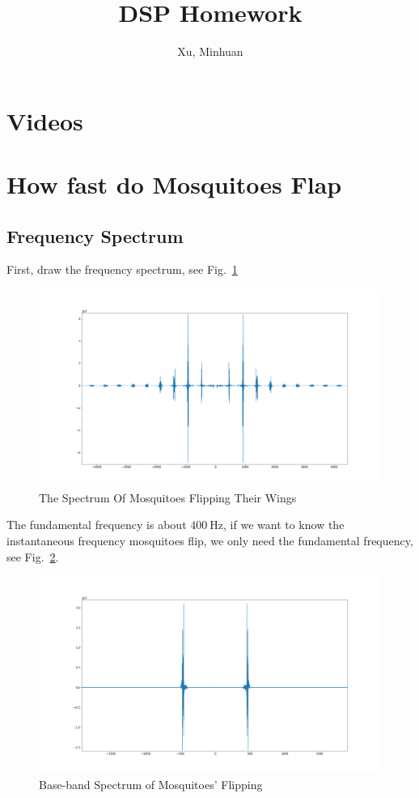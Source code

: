 \documentclass{article}
\begin{document}
\title{DSP Homework}
\author{Xu, Minhuan}
\maketitle
\tableofcontents
\begin{abstract}

\end{abstract}

\section{Videos}

\section{How fast do Mosquitoes Flap}
\subsection{Frequency Spectrum}
First, draw the frequency spectrum, see Fig.~\ref{fig:MosquitoSpec}
\begin{figure}[!h]
	\centering
	\includegraphics[width=5 in]{../pic/MosquitoSpec.png}
	\caption{The Spectrum Of Mosquitoes Flipping Their Wings}
	\label{fig:MosquitoSpec}
\end{figure}
The fundamental frequency is about $400~\mathrm{Hz}$, if we want to know the instantaneous frequency mosquitoes flip, we only need the fundamental frequency, see Fig.~\ref{fig:FilteredMosquito}.
\begin{figure}[!h]
	\centering
	\includegraphics[width=5 in]{../pic/FilteredMosquitoFlip.png}
	\caption{Base-band Spectrum of Mosquitoes' Flipping}
	\label{fig:FilteredMosquito}
\end{figure}
\end{document}
